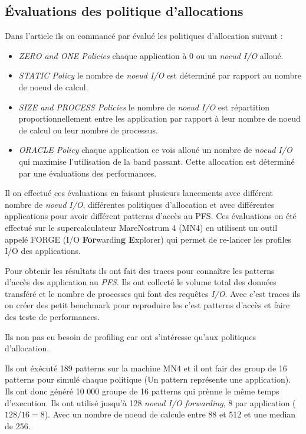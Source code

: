 \documentclass[10pt, a4paper]{article}
\begin{document}
\subsection{Évaluations des politique d'allocations}

Dans l'article ils on commancé par évalué les politiques d'allocation suivant :
\begin{itemize}
  \item \emph{ZERO and ONE Policies} chaque application à 0 ou un \emph{noeud I/O} alloué.
  \item \emph{STATIC Policy} le nombre de \emph{noeud I/O} est déterminé par rapport au nombre de noeud de calcul.
  \item \emph{SIZE and PROCESS Policies} le nombre de \emph{noeud I/O} est répartition proportionnellement entre les application par rapport à leur nombre de noeud de calcul ou leur nombre de processus.
  \item \emph{ORACLE Policy} chaque application ce vois alloué un nombre de \emph{noeud I/O} qui maximise l'utilisation de la band passant. Cette allocation est déterminé par une évaluations des performances.
\end{itemize}

Il on effectué ces évaluations en faisant plusieurs lancements avec différent nombre de \emph{noeud I/O}, différentes politiques d'allocation et avec différentes applications pour avoir différent patterns d'accès au PFS. Ces évaluations on été effectué sur le supercalculateur MareNostrum 4 (MN4) en utilisent un outil appelé FORGE (I/O \textbf{For}wardin\textbf{g E}xplorer) qui permet de re-lancer les profiles I/O des applications.

Pour obtenir les résultats ils ont fait des traces pour connaître les patterns d'accès des application au \emph{PFS}. Ils ont collecté le volume total des données transféré et le nombre de processes qui font des requêtes \emph{I/O}. Avec c'est traces ils on créer des petit benchmark pour reproduire les c'est patterns d'accès et faire des teste de performances.

Ils non pas eu besoin de profiling car ont s'intéresse qu'aux politiques d'allocation.

Ils ont éxécuté 189 patterns sur la machine MN4 et il ont fair des group de 16 patterns pour simulé chaque politique (Un pattern représente une application).
Ils ont donc généré 10 000 groupe de 16 patterns qui prènne le même temps d'execution.
Ils ont utilisé jusqu'à 128 \emph{noeud I/O forwarding}, 8 par application ($128/16=8$). Avec un nombre de noeud de calcule entre 88 et 512 et une median de 256.
\end{document}
